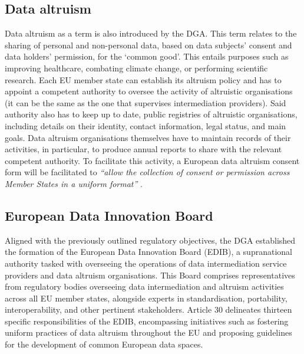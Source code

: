 \subsection{Data altruism}
\label{sec:altruism}

Data altruism as a term is also introduced by the DGA.
This term relates to the sharing of personal and non-personal data, based on data subjects' consent and data holders' permission, for the `common good'.
This entails purposes such as improving healthcare, combating climate change, or performing scientific research.
Each EU member state can establish its altruism policy and has to appoint a competent authority to oversee the activity of altruistic organisations (it can be the same as the one that supervises intermediation providers).
Said authority also has to keep up to date, public registries of altruistic organisations, including details on their identity, contact information, legal status, and main goals.
Data altruism organisations themselves have to maintain records of their activities, in particular, to produce annual reports to share with the relevant competent authority.
To facilitate this activity, a European data altruism consent form will be facilitated  to \textit{``allow the collection of consent or permission across Member States in a uniform format''} \citeyearpar{noauthor_regulation_2022}.

\subsection{European Data Innovation Board}
\label{sec:edib}

Aligned with the previously outlined regulatory objectives, the DGA established the formation of the European Data Innovation Board (EDIB), a supranational authority tasked with overseeing the operations of data intermediation service providers and data altruism organisations.
This Board comprises representatives from regulatory bodies overseeing data intermediation and altruism activities across all EU member states, alongside experts in standardisation, portability, interoperability, and other pertinent stakeholders.
Article 30 \citeyearpar{noauthor_regulation_2022} delineates thirteen specific responsibilities of the EDIB, encompassing initiatives such as fostering uniform practices of data altruism throughout the EU and proposing guidelines for the development of common European data spaces.


